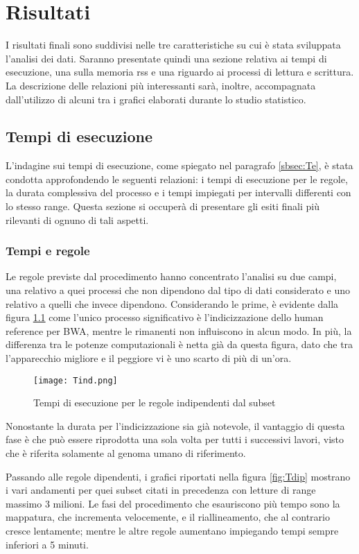 \chapter{Risultati}
\label{cap:3}
I risultati finali sono suddivisi nelle tre caratteristiche su cui è stata sviluppata l'analisi dei dati.
Saranno presentate quindi una sezione relativa ai tempi di esecuzione, una sulla memoria rss e una riguardo ai processi di lettura e scrittura. 
La descrizione delle relazioni più interessanti sarà, inoltre, accompagnata dall'utilizzo di alcuni tra i grafici elaborati durante lo studio statistico.

\section{Tempi di esecuzione}
L'indagine sui tempi di esecuzione, come spiegato nel paragrafo \ref{sbsec:Te}, è stata condotta approfondendo le seguenti relazioni: i tempi di esecuzione per le regole, la durata complessiva del processo e i tempi impiegati per intervalli differenti con lo stesso range. 
Questa sezione si occuperà di presentare gli esiti finali più rilevanti di ognuno di tali aspetti.

\subsection{Tempi e regole}
Le regole previste dal procedimento hanno concentrato l'analisi su due campi, una relativo a quei processi che non dipendono dal tipo di dati considerato e uno relativo a quelli che invece dipendono. 
Considerando le prime, è evidente dalla figura \ref{fig:Tind} come l'unico processo significativo è l'indicizzazione dello human reference per BWA, mentre le rimanenti non influiscono in alcun modo. 
In più, la differenza tra le potenze computazionali è netta già da questa figura, dato che tra l'apparecchio migliore e il peggiore vi è uno scarto di più di un'ora.
\begin{figure}[H]
\centering
\texttt{[image: Tind.png]}
\caption{Tempi di esecuzione per le regole indipendenti dal subset}
\label{fig:Tind}
\end{figure}
Nonostante la durata per l'indicizzazione sia già notevole, il vantaggio di questa fase  è che può essere riprodotta una sola volta per tutti i successivi lavori, visto che è riferita solamente al genoma umano di riferimento.

Passando alle regole dipendenti, i grafici riportati nella figura \ref{fig:Tdip} mostrano i vari andamenti per quei subset citati in precedenza con letture di range massimo 3 milioni.
Le fasi del procedimento che esauriscono più tempo sono la mappatura, che incrementa velocemente, e il riallineamento, che al contrario cresce lentamente; mentre le altre regole aumentano impiegando tempi sempre inferiori a 5 minuti.

